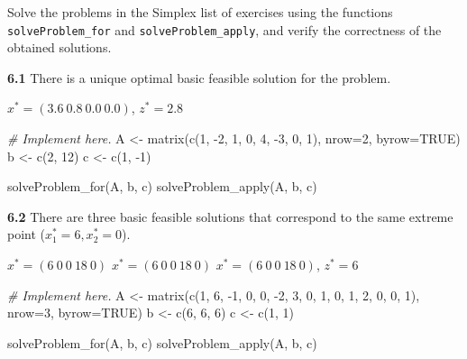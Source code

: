 \documentclass[
]{article}
\newenvironment{Shaded}{\begin{snugshade}}{\end{snugshade}}
\newcommand{\AttributeTok}[1]{\textcolor[rgb]{0.77,0.63,0.00}{#1}}
\newcommand{\CommentTok}[1]{\textcolor[rgb]{0.56,0.35,0.01}{\textit{#1}}}
\newcommand{\ConstantTok}[1]{\textcolor[rgb]{0.00,0.00,0.00}{#1}}
\newcommand{\DecValTok}[1]{\textcolor[rgb]{0.00,0.00,0.81}{#1}}
\newcommand{\FunctionTok}[1]{\textcolor[rgb]{0.00,0.00,0.00}{#1}}
\newcommand{\NormalTok}[1]{#1}
\newcommand{\OtherTok}[1]{\textcolor[rgb]{0.56,0.35,0.01}{#1}}
\newcommand{\SpecialCharTok}[1]{\textcolor[rgb]{0.00,0.00,0.00}{#1}}
\begin{document}
Solve the problems in the Simplex list of exercises using the functions
\texttt{solveProblem\_for} and \texttt{solveProblem\_apply}, and verify
the correctness of the obtained solutions.

\textbf{6.1} There is a unique optimal basic feasible solution for the
problem.

\(x^*= (3.6 \ 0.8\  0.0\  0.0)\), \(z^*= 2.8\)

\begin{Shaded}
\begin{Highlighting}[]
\CommentTok{\# Implement here.}
\NormalTok{A }\OtherTok{\textless{}{-}} \FunctionTok{matrix}\NormalTok{(}\FunctionTok{c}\NormalTok{(}\DecValTok{1}\NormalTok{, }\SpecialCharTok{{-}}\DecValTok{2}\NormalTok{, }\DecValTok{1}\NormalTok{, }\DecValTok{0}\NormalTok{, }\DecValTok{4}\NormalTok{, }\SpecialCharTok{{-}}\DecValTok{3}\NormalTok{, }\DecValTok{0}\NormalTok{, }\DecValTok{1}\NormalTok{), }\AttributeTok{nrow=}\DecValTok{2}\NormalTok{, }\AttributeTok{byrow=}\ConstantTok{TRUE}\NormalTok{)}
\NormalTok{b }\OtherTok{\textless{}{-}} \FunctionTok{c}\NormalTok{(}\DecValTok{2}\NormalTok{, }\DecValTok{12}\NormalTok{)}
\NormalTok{c }\OtherTok{\textless{}{-}} \FunctionTok{c}\NormalTok{(}\DecValTok{1}\NormalTok{, }\SpecialCharTok{{-}}\DecValTok{1}\NormalTok{)}

\FunctionTok{solveProblem\_for}\NormalTok{(A, b, c)}
\FunctionTok{solveProblem\_apply}\NormalTok{(A, b, c)}
\end{Highlighting}
\end{Shaded}

\textbf{6.2} There are three basic feasible solutions that correspond to
the same extreme point (\(x^*_1=6, x^*_2=0\)).

\(x^*= (6\  0\  0\ 18\  0)\) \(x^*= (6\  0\  0\ 18\  0)\)
\(x^*= (6\  0\  0\ 18\  0)\), \(z^*= 6\)

\begin{Shaded}
\begin{Highlighting}[]
\CommentTok{\# Implement here.}
\NormalTok{A }\OtherTok{\textless{}{-}} \FunctionTok{matrix}\NormalTok{(}\FunctionTok{c}\NormalTok{(}\DecValTok{1}\NormalTok{, }\DecValTok{6}\NormalTok{, }\SpecialCharTok{{-}}\DecValTok{1}\NormalTok{, }\DecValTok{0}\NormalTok{, }\DecValTok{0}\NormalTok{, }\SpecialCharTok{{-}}\DecValTok{2}\NormalTok{, }\DecValTok{3}\NormalTok{, }\DecValTok{0}\NormalTok{, }\DecValTok{1}\NormalTok{, }\DecValTok{0}\NormalTok{, }\DecValTok{1}\NormalTok{, }\DecValTok{2}\NormalTok{, }\DecValTok{0}\NormalTok{, }\DecValTok{0}\NormalTok{, }\DecValTok{1}\NormalTok{), }\AttributeTok{nrow=}\DecValTok{3}\NormalTok{, }\AttributeTok{byrow=}\ConstantTok{TRUE}\NormalTok{)}
\NormalTok{b }\OtherTok{\textless{}{-}} \FunctionTok{c}\NormalTok{(}\DecValTok{6}\NormalTok{, }\DecValTok{6}\NormalTok{, }\DecValTok{6}\NormalTok{)}
\NormalTok{c }\OtherTok{\textless{}{-}} \FunctionTok{c}\NormalTok{(}\DecValTok{1}\NormalTok{, }\DecValTok{1}\NormalTok{)}

\FunctionTok{solveProblem\_for}\NormalTok{(A, b, c)}
\FunctionTok{solveProblem\_apply}\NormalTok{(A, b, c)}
\end{Highlighting}
\end{Shaded}
\end{document}
